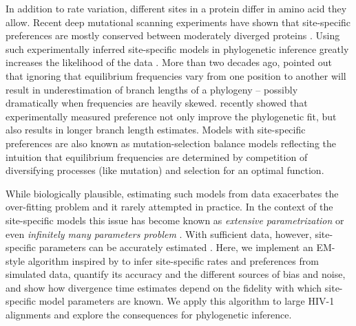 \documentclass[aps,rmp,twocolumn,linenumbers]{revtex4-1}
\begin{document}
In addition to rate variation, different sites in a protein differ in amino acid they allow.
Recent deep mutational scanning experiments have shown that site-specific preferences are mostly conserved between moderately diverged proteins \citep{doud_site-specific_2015}.
Using such experimentally inferred site-specific models in phylogenetic inference greatly increases the likelihood of the data \cite{bloom2014experimentally}.
More than two decades ago, \citet{halpern_evolutionary_1998} pointed out that ignoring that equilibrium frequencies vary from one position to another will result in underestimation of branch lengths of a phylogeny -- possibly dramatically when frequencies are heavily skewed.
\citet{hilton_modeling_2018} recently showed that experimentally measured preference not only improve the phylogenetic fit, but also results in longer branch length estimates.
Models with site-specific preferences are also known as mutation-selection balance models \citep{bruno1996modeling,yang2008mutation} reflecting the intuition that equilibrium frequencies are determined by competition of diversifying processes (like mutation) and selection for an optimal function.

While biologically plausible, estimating such models from data exacerbates the over-fitting problem and it rarely attempted in practice.
In the context of the site-specific models this issue has become known as {\em extensive parametrization} or even {\em infinitely many parameters problem} \cite{Rodrigue557,spielman2016extensively}.
With sufficient data, however, site-specific parameters can be accurately estimated \citep{tamuri_estimating_2012,spielman2016extensively,scheffler2014validity}.
Here, we implement an EM-style algorithm inspired by \citep{bruno1996modeling} to infer site-specific rates and preferences from simulated data, quantify its accuracy and the different sources of bias and noise, and show how divergence time estimates depend on the fidelity with which site-specific model parameters are known.
We apply this algorithm to large HIV-1 alignments and explore the consequences for phylogenetic inference.
\end{document}
